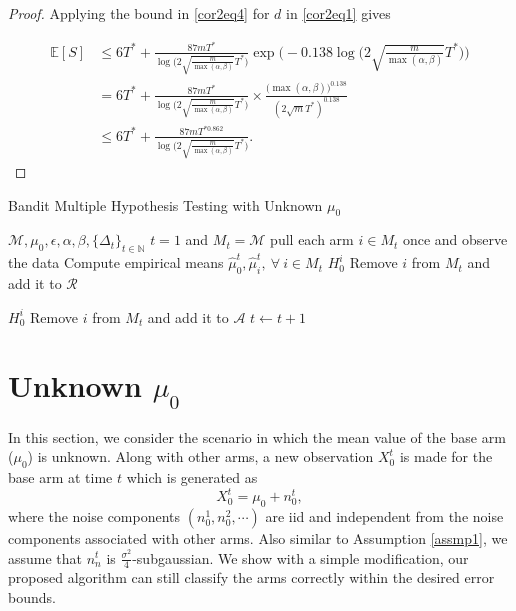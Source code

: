\documentclass[12pt]{article}
\def\E{\mathbb{E}}
\def\MM{\mathcal{M}}
\def\RR{\mathcal{R}}
\def\AA{\mathcal{A}}
\begin{document}
\begin{proof}
Applying the bound in \eqref{cor2eq4} for $d$ in \eqref{cor2eq1} gives


\begin{equation}
\label{cor2eq5}
\begin{aligned}
\E[S] &\leq 6T^* + \frac{87mT^*}{\log\Big(2\sqrt{\frac{m}{\max(\alpha,\beta)}}T^*\Big)}\exp\bigg(-0.138\log\Big(2\sqrt{\frac{m}{\max(\alpha,\beta)}}T^*\Big)\bigg)\\
& = 6T^* + \frac{87mT^*}{\log\Big(2\sqrt{\frac{m}{\max(\alpha,\beta)}}T^*\Big)}\times \frac{\big(\max(\alpha,\beta)\big)^{0.138}}{(2\sqrt{m}T^*)^{0.138}}\\
&\leq 6T^* + \frac{87 m T^{*0.862}}{\log\Big(2\sqrt{\frac{m}{\max(\alpha,\beta)}}T^*\Big)}.
\end{aligned}
\end{equation}

\end{proof}


\begin{algorithm}[tb]
   \caption{Bandit Multiple Hypothesis Testing with Unknown $\mu_0$}
   \label{alg2}
\begin{algorithmic}
    $\MM,\mu_0,\epsilon,\alpha,\beta,\{\Delta_t\}_{t\in\mathbb{N}}$
    $t=1$ and $M_t = \MM$
   \STATE pull each arm $i\in M_t$ once and observe the data
   \STATE Compute empirical means $\hat\mu_0^t,\hat\mu^t_i,~\forall~i\in M_t$
  		 $H_0^i$
  		\STATE Remove $i$ from $M_t$ and add it to $\RR$
  	\ENDIF
  	
  		 $H_0^i$
  		\STATE Remove $i$ from $M_t$ and add it to $\AA$
  	\ENDIF
  \ENDFOR
  \STATE $t \leftarrow t+1$
   \ENDWHILE
   
\end{algorithmic}
\end{algorithm} 


\section{Unknown $\mu_0$}
In this section, we consider the scenario in which the mean value of the base arm ($\mu_0$) is unknown. Along with other arms, a new observation $X^t_0$ is made for the base arm at time $t$ which is generated as 
\begin{equation}
\label{basearmdata}
X^t_0 = \mu_0 + n^t_0,
\end{equation}
where the noise components $(n^1_0,n^2_0,\cdots)$ are iid and independent from the noise components associated with other arms. Also similar to Assumption \ref{assmp1}, we assume that $n^t_n$ is $\frac{\sigma^2}{4}$-subgaussian. We show with a simple modification, our proposed algorithm can still classify the arms correctly within the desired error bounds.
\end{document}

